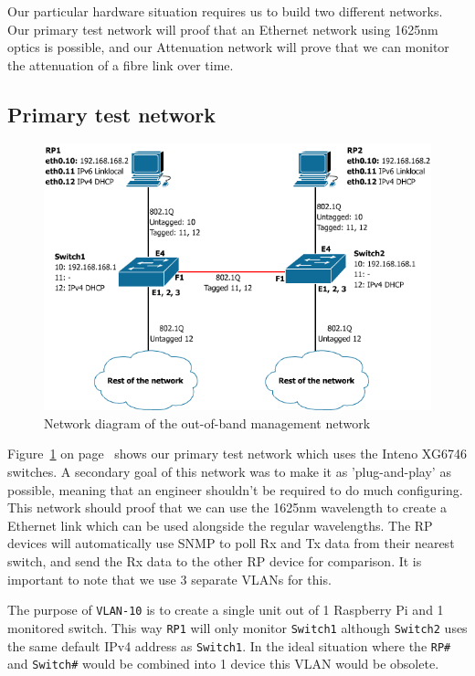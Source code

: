 \documentclass{article}
\begin{document}
Our particular hardware situation requires us to build two different networks. Our primary test network will proof that an Ethernet network using 1625nm optics is possible, and our Attenuation network will prove that we can monitor the attenuation of a fibre link over time.

\subsection{Primary test network}
\begin{figure}[h]
\centerline{\includegraphics[scale=0.4]{images/PoC_all.png}}
\caption{Network diagram of the out-of-band management network}
\label{fig:poc_all}
\end{figure}

Figure~\ref{fig:poc_all} on page~\pageref{fig:poc_all} shows our primary test network which uses the Inteno XG6746 switches. A secondary goal of this network was to make it as 'plug-and-play' as possible, meaning that an engineer shouldn't be required to do much configuring. This network should proof that we can use the 1625nm wavelength to create a Ethernet link which can be used alongside the regular wavelengths. The RP devices will automatically use SNMP to poll Rx and Tx data from their nearest switch, and send the Rx data to the other RP device for comparison. It is important to note that we use 3 separate VLANs for this. 

The purpose of \texttt{VLAN-10} is to create a single unit out of 1 Raspberry Pi and 1 monitored switch. This way \texttt{RP1} will only monitor \texttt{Switch1} although \texttt{Switch2} uses the same default IPv4 address as \texttt{Switch1}. In the ideal situation where the \texttt{RP\#} and \texttt{Switch\#} would be combined into 1 device this VLAN would be obsolete.
\end{document}
